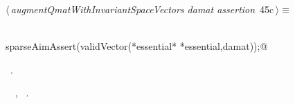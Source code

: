 \documentclass{article}
\begin{document}
\begin{flushleft} \small
\begin{minipage}{\linewidth}\label{scrap62}\raggedright\small
{} $\langle\,${\itshape augmentQmatWithInvariantSpaceVectors damat assertion}\nobreak\ {\footnotesize {45c}}$\,\rangle\equiv$
\vspace{-1ex}
\begin{list}{}{} \item
\mbox{}\verb@@\\
\mbox{}\verb@  sparseAimAssert(validVector(*essential* *essential,damat));@\\
\mbox{}\verb@@{\NWsep}
\end{list}
\vspace{-1.5ex}
\footnotesize
\begin{list}{}{\setlength{\itemsep}{-\parsep}\setlength{\itemindent}{-\leftmargin}}
\item \NWtxtMacroRefIn\ .
\item \NWtxtIdentsUsed\nobreak\  \verb@damat@\nobreak\ , \verb@essential@\nobreak\ .
\item{}
\end{list}
\end{minipage}\vspace{4ex}
\end{flushleft}
\end{document}
